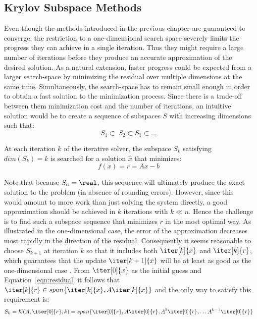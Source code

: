 \subsection{Krylov Subspace Methods}
\label{sec:krylov_methods}

Even though the methods introduced in the previous chapter are guaranteed to converge, the restriction to a one-dimensional search space severely limits the progress they can achieve in a single iteration. Thus they might require a large number of iterations before they produce an accurate approximation of the desired solution. As a natural extension, faster progress could be expected from a larger search-space by minimizing the residual over multiple dimensions at the same time. Simultaneously, the search-space has to remain small enough in order to obtain a fast solution to the minimization process. Since there is a trade-off between them minimization cost and the number of iterations, an intuitive solution would be to create a sequence of subspaces $S$ with increasing dimensions such that:
\begin{equation}
    S_1 \subset \ S_2 \subset S_3 \subset \dots
\end{equation}

\noindent At each iteration $k$ of the iterative solver, the subspace $S_k$ satisfying $dim(S_k)=k$ is searched for a solution $\hat{x}$ that minimizes:
\begin{equation}
\label{eqn:residual}
    f(x)= r = Ax-b
\end{equation}

\noindent Note that because $S_n=\real$, this sequence will ultimately produce the exact solution to the problem (in absence of rounding errors). However, since this would amount to more work than just solving the system directly, a good approximation should be achieved in $k$ iterations with $k \ll n$. Hence the challenge is to find such a subspace sequence that minimizes $r$ in the most optimal way. As illustrated in the one-dimensional case, the error of the approximation decreases most rapidly in the direction of the residual. Consequently it seems reasonable to choose $S_{k+1}$ at iteration $k$ so that it includes both $\iter[k]{x}$ and $\iter[k]{r}$, which guarantees that the update $\iter[k+1]{x}$ will be at least as good as the one-dimensional case \cite{golub_matrix_2013}. From $\iter[0]{x}$ as the initial guess and Equation~\hyperref[eqn:residual]{\ref{eqn:residual}} it follows that $\iter[k]{r} \in span\{\iter[k]{x},A\iter[k]{x}\}$ and the only way to satisfy this requirement is:
\begin{equation}
    S_k=\mathcal{K}(A,\iter[0]{r}, k) = span\{\iter[0]{r}, A\iter[0]{r}, A^2\iter[0]{r},\dots A^{k-1}\iter[0]{r}\}
\end{equation}


